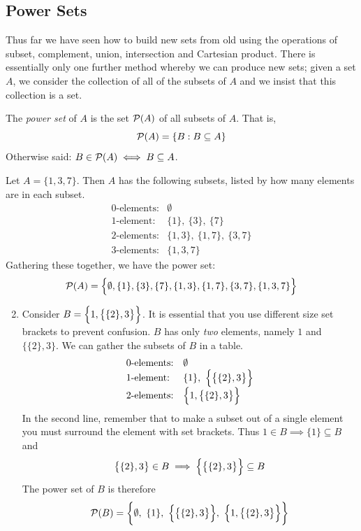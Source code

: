\clearpage
\iffalse

\subsection{Power Sets}\label{sec:power}

Thus far we have seen how to build new sets from old using the operations of subset, complement, union, intersection and Cartesian product. There is essentially only one further method whereby we can produce new sets; given a set $A$, we consider the collection of all of the subsets of $A$ and we insist that this collection is a set.

\begin{defn}{}{}
	The \emph{power set} of $A$ is the set $\mathcal{P}(A)$ of all subsets of $A$. That is,
	\[
		\mathcal{P}(A)=\{B:B\subseteq A\}
	\]
	Otherwise said: $B\in\mathcal{P}(A)\iff B\subseteq A$.
\end{defn}

\begin{examples}{}{}
	\exstart Let $A=\{1,3,7\}$. Then $A$ has the following subsets, listed by how many elements are in each subset.
	\[
		\begin{array}{ll}
			\text{0-elements:}&\emptyset\\
			\text{1-element:}&\{1\},\ \{3\},\ \{7\}\\
			\text{2-elements:}&\{1,3\},\ \{1,7\},\ \{3,7\}\\
			\text{3-elements:}&\{1,3,7\}
		\end{array}
	\]
	Gathering these together, we have the power set:
	\[
		\mathcal{P}(A)=\Bigl\{\emptyset,\{1\},\{3\},\{7\},\{1,3\},\{1,7\},\{3,7\},\{1,3,7\}\Bigr\}
	\]
	\begin{enumerate}\setcounter{enumi}{1}
	  \item Consider $B=\Bigl\{1,\bigl\{\{2\},3\bigr\}\Bigr\}$. It is essential that you use different size set brackets to prevent confusion. $B$ has only \emph{two} elements, namely $1$ and $\bigl\{\{2\},3\bigr\}$. We can gather the subsets of $B$ in a table.
		\[
			\begin{array}{ll}
				\text{0-elements:}&\emptyset\\
				\text{1-element:}&\{1\},\ \Bigl\{\bigl\{\{2\},3\bigr\}\Bigr\}\\
				\text{2-elements:}&\Bigl\{1,\bigl\{\{2\},3\bigr\}\Bigr\}
			\end{array}
		\]
		In the second line, remember that to make a subset out of a single element you must surround the element with set brackets. Thus $1\in B\implies \{1\}\subseteq B$ and
		\[
			\bigl\{\{2\},3\bigr\}\in B\implies \Bigl\{\bigl\{\{2\},3\bigr\}\Bigr\}\subseteq B
		\]
		The power set of $B$ is therefore
		\[
			\cP(B)=\biggl\{\emptyset,\ \{1\},\ \Bigl\{\bigl\{\{2\},3\bigr\}\Bigr\},\ \Bigl\{1,\bigl\{\{2\},3\bigr\}\Bigr\}\biggr\}
		\]
	\end{enumerate}
\end{examples}


